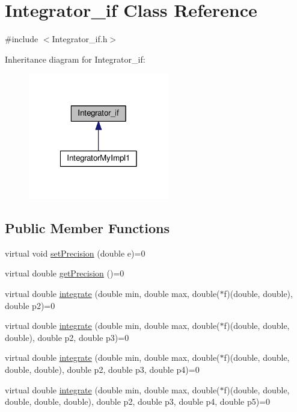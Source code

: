 \hypertarget{class_integrator__if}{\section{Integrator\-\_\-if Class Reference}
\label{class_integrator__if}
}


{\ttfamily \#include $<$Integrator\-\_\-if.\-h$>$}



Inheritance diagram for Integrator\-\_\-if\-:
\nopagebreak
\begin{figure}[H]
\begin{center}
\leavevmode
\includegraphics[width=174pt]{class_integrator__if__inherit__graph}
\end{center}
\end{figure}
\subsection*{Public Member Functions}
\begin{DoxyCompactItemize}
\item 
virtual void \hyperlink{class_integrator__if_a49c27818a4b0caf41c39d22a18b41337}{set\-Precision} (double e)=0
\item 
virtual double \hyperlink{class_integrator__if_af3ab4e8ffa96c8970b2e3c980f84e89d}{get\-Precision} ()=0
\item 
virtual double \hyperlink{class_integrator__if_a841c836fd72d4c428178d1e28a999ec9}{integrate} (double min, double max, double($\ast$f)(double, double), double p2)=0
\item 
virtual double \hyperlink{class_integrator__if_a193d992d6101517249d9bee153607aa6}{integrate} (double min, double max, double($\ast$f)(double, double, double), double p2, double p3)=0
\item 
virtual double \hyperlink{class_integrator__if_a306e4fcb840f789d7a918550fa20cc28}{integrate} (double min, double max, double($\ast$f)(double, double, double, double), double p2, double p3, double p4)=0
\item 
virtual double \hyperlink{class_integrator__if_abaeac01142a4da07ba0f07a52732ac79}{integrate} (double min, double max, double($\ast$f)(double, double, double, double, double), double p2, double p3, double p4, double p5)=0
\end{DoxyCompactItemize}


